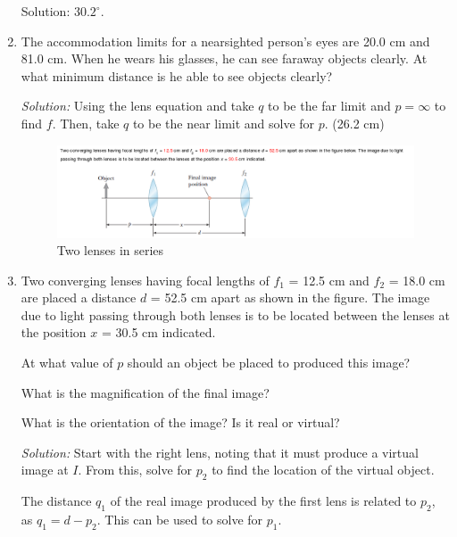 \documentclass[a4paper,10pt]{report}
\begin{document}
\begin{enumerate}
  Solution: $30.2^{\circ}$.

  \item
    The accommodation limits for a nearsighted person's eyes are 20.0 cm and 81.0 cm. When he wears his glasses, he can see faraway objects clearly. At what minimum distance is he able to see objects clearly?

    \textit{Solution:} Using the lens equation and take $q$ to be the far limit and  $p=\infty$ to find $f$. Then, take $q$ to be the near limit and solve for $p$.
    (26.2 cm)

    \begin{figure}[h!]
    \begin{centering}
    \begin{center}
    \includegraphics[width=\linewidth]{./Images/hw_double_lenses.png}
    \caption{Two lenses in series}
    \label{fig:hw_double_lenses}
    \end{center}
    \par\end{centering}
    \end{figure}

    \item
      Two converging lenses having focal lengths of $f_1$ = 12.5 cm and $f_2$ = 18.0 cm are placed a distance $d$ = 52.5 cm apart as shown in the figure. The image due to light passing through both lenses is to be located between the lenses at the position $x$ = 30.5 cm indicated.

      At what value of $p$ should an object be placed to produced this image?

      What is the magnification of the final image?

      What is the orientation of the image? Is it real or virtual?

      \hrulefill

      \textit{Solution:}
      Start with the right lens, noting that it must produce a virtual image at $I$. From this, solve for $p_2$ to find the location of the virtual object.

      The distance $q_1$ of the real image produced by the first lens is related to $p_2$, as $q_1 = d - p_2$. This can be used to solve for $p_1$.


\end{enumerate}
\end{document}

